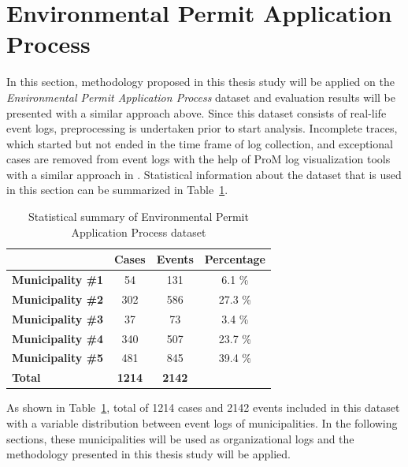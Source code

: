 \section{Environmental Permit Application Process}
\label{sec:environmental-permit-application-process}
In this section, methodology proposed in this thesis study will be applied on the \textit{Environmental Permit Application Process} dataset \cite{coselog-data} and evaluation results will be presented with a similar approach above. Since this dataset consists of real-life event logs, preprocessing is undertaken prior to start analysis. Incomplete traces, which started but not ended in the time frame of log collection, and exceptional cases are removed from event logs with the help of ProM log visualization tools with a similar approach in \cite{buijs2014flexible}. Statistical information about the dataset that is used in this section can be summarized in Table~\ref{table:coselog-process-summary}.

 \begin{table}[]
\centering
\caption{Statistical summary of Environmental Permit Application Process dataset}
\label{table:coselog-process-summary}
\begin{tabular}{lccc}
\hline
                       & {\bf Cases} & {\bf Events} & {\bf Percentage} \\ \hline
{\bf Municipality \#1} & 54          & 131          & 6.1 \%           \\ \hline
{\bf Municipality \#2} & 302         & 586          & 27.3 \%          \\ \hline
{\bf Municipality \#3} & 37          & 73           & 3.4 \%           \\ \hline
{\bf Municipality \#4} & 340         & 507          & 23.7 \%          \\ \hline
{\bf Municipality \#5} & 481         & 845          & 39.4 \%          \\
{\bf Total}            & {\bf 1214}  & {\bf 2142}   & {\bf }           \\ \hline
\end{tabular}
\end{table}

As shown in Table~\ref{table:coselog-process-summary}, total of 1214 cases and 2142 events included in this dataset with a variable distribution between event logs of municipalities. In the following sections, these municipalities will be used as organizational logs and the methodology presented in this thesis study will be applied.

